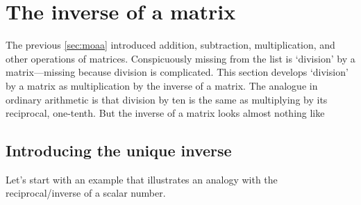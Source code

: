 
\section{The inverse of a matrix}
\label{sec:im}
\secttoc

\begin{comment}
\pooliv{p.163--9}  \layiv{\S2.2--3}  \cite[\S3.2]{Nakos1998}  \cite[Ch.~6]{Chartier2015}
\end{comment}


The previous \cref{sec:moaa} introduced addition, subtraction, multiplication, and other operations of matrices.  
Conspicuously missing from the list is `division' by a matrix---missing because division is complicated.
This section develops `division' by a matrix as multiplication by the inverse of a matrix.
The analogue in ordinary arithmetic is that division by ten is the same as multiplying by its reciprocal, one-tenth.
But the inverse of a matrix looks almost nothing like 


\subsection{Introducing the unique inverse}

Let's start with an example that illustrates an analogy with the reciprocal\slash inverse of a scalar number.

